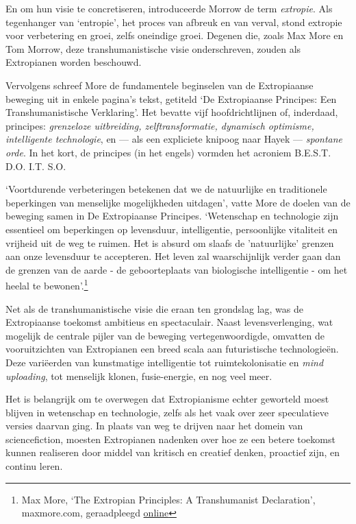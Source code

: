 \documentclass[smalldemyvopaper,11pt,twoside,onecolumn,openright,extrafontsizes,hidelinks]{memoir}
\begin{document}
En om hun visie te concretiseren, introduceerde Morrow de term
\emph{extropie}. Als tegenhanger van `entropie', het proces van afbreuk
en van verval, stond extropie voor verbetering en groei, zelfs oneindige
groei. Degenen die, zoals Max More en Tom Morrow, deze
transhumanistische visie onderschreven, zouden als Extropianen worden
beschouwd.

Vervolgens schreef More de fundamentele beginselen van de Extropiaanse
beweging uit in enkele pagina's tekst, getiteld `De Extropiaanse
Principes: Een Transhumanistische Verklaring'. Het bevatte vijf
hoofdrichtlijnen of, inderdaad, principes: \emph{grenzeloze uitbreiding,
zelftransformatie, dynamisch optimisme, intelligente technologie}, en
--- als een expliciete knipoog naar Hayek --- \emph{spontane orde}. In
het kort, de principes (in het engels) vormden het acroniem B.E.S.T.
D.O. I.T. S.O.

`Voortdurende verbeteringen betekenen dat we de natuurlijke en
traditionele beperkingen van menselijke mogelijkheden uitdagen', vatte
More de doelen van de beweging samen in De Extropiaanse Principes.
`Wetenschap en technologie zijn essentieel om beperkingen op levensduur,
intelligentie, persoonlijke vitaliteit en vrijheid uit de weg te ruimen.
Het is absurd om slaafs de 'natuurlijke' grenzen aan onze levensduur te
accepteren. Het leven zal waarschijnlijk verder gaan dan de grenzen van
de aarde - de geboorteplaats van biologische intelligentie - om het
heelal te bewonen'.\footnote{Max More, `The Extropian Principles: A
  Transhumanist Declaration', maxmore.com, geraadpleegd
  \href{https://web.archive.org/web/20090130143449/https://www.maxmore.com/extprn3.htm}{online}}

Net als de transhumanistische visie die eraan ten grondslag lag, was de
Extropiaanse toekomst ambitieus en spectaculair. Naast levensverlenging,
wat mogelijk de centrale pijler van de beweging vertegenwoordigde,
omvatten de vooruitzichten van Extropianen een breed scala aan
futuristische technologieën. Deze variëerden van kunstmatige
intelligentie tot ruimtekolonisatie en \emph{mind uploading}, tot
menselijk klonen, fusie-energie, en nog veel meer.

Het is belangrijk om te overwegen dat Extropianisme echter geworteld
moest blijven in wetenschap en technologie, zelfs als het vaak over zeer
speculatieve versies daarvan ging. In plaats van weg te drijven naar het
domein van sciencefiction, moesten Extropianen nadenken over hoe ze een
betere toekomst kunnen realiseren door middel van kritisch en creatief
denken, proactief zijn, en continu leren.
\end{document}
